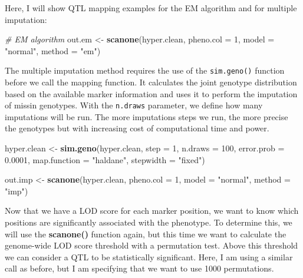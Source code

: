 \documentclass[12pt,]{krantz}
\newenvironment{Shaded}{\begin{snugshade}}{\end{snugshade}}
\newcommand{\KeywordTok}[1]{\textcolor[rgb]{0.27,0.27,0.27}{\textbf{{#1}}}}
\newcommand{\DataTypeTok}[1]{\textcolor[rgb]{0.27,0.27,0.27}{{#1}}}
\newcommand{\DecValTok}[1]{\textcolor[rgb]{0.06,0.06,0.06}{{#1}}}
\newcommand{\FloatTok}[1]{\textcolor[rgb]{0.06,0.06,0.06}{{#1}}}
\newcommand{\StringTok}[1]{\textcolor[rgb]{0.5,0.5,0.5}{{#1}}}
\newcommand{\CommentTok}[1]{\textcolor[rgb]{0.37,0.37,0.37}{\textit{{#1}}}}
\newcommand{\NormalTok}[1]{{#1}}
\theoremstyle{definition}
\theoremstyle{definition}
\theoremstyle{remark}
\begin{document}
Here, I will show QTL mapping examples for the EM algorithm and for
multiple imputation:

\begin{Shaded}
\begin{Highlighting}[]
\CommentTok{# EM algorithm}
\NormalTok{out.em <-}\StringTok{ }\KeywordTok{scanone}\NormalTok{(hyper.clean, }\DataTypeTok{pheno.col =} \DecValTok{1}\NormalTok{, }\DataTypeTok{model =} \StringTok{"normal"}\NormalTok{, }
                  \DataTypeTok{method =} \StringTok{"em"}\NormalTok{)}
\end{Highlighting}
\end{Shaded}

The multiple imputation method requires the use of the
\texttt{sim.geno()} function before we call the mapping function. It
calculates the joint genotype distribution based on the available marker
information and uses it to perform the imputation of missin genotypes.
With the \texttt{n.draws} parameter, we define how many imputations will
be run. The more imputations steps we run, the more precise the
genotypes but with increasing cost of computational time and power.

\begin{Shaded}
\begin{Highlighting}[]
\NormalTok{hyper.clean <-}\StringTok{ }\KeywordTok{sim.geno}\NormalTok{(hyper.clean, }\DataTypeTok{step =} \DecValTok{1}\NormalTok{, }\DataTypeTok{n.draws =} \DecValTok{100}\NormalTok{, }
                        \DataTypeTok{error.prob =} \FloatTok{0.0001}\NormalTok{, }
                        \DataTypeTok{map.function =} \StringTok{"haldane"}\NormalTok{, }
                        \DataTypeTok{stepwidth =} \StringTok{"fixed"}\NormalTok{)}

\NormalTok{out.imp <-}\StringTok{ }\KeywordTok{scanone}\NormalTok{(hyper.clean, }\DataTypeTok{pheno.col =} \DecValTok{1}\NormalTok{, }\DataTypeTok{model =} \StringTok{"normal"}\NormalTok{, }
                   \DataTypeTok{method =} \StringTok{"imp"}\NormalTok{)}
\end{Highlighting}
\end{Shaded}

Now that we have a LOD score for each marker position, we want to know
which positions are significantly associated with the phenotype. To
determine this, we will use the \textbf{scanone()} function again, but
this time we want to calculate the genome-wide LOD score threshold with
a permutation test. Above this threshold we can consider a QTL to be
statistically significant. Here, I am using a similar call as before,
but I am specifying that we want to use 1000 permutations.
\end{document}
